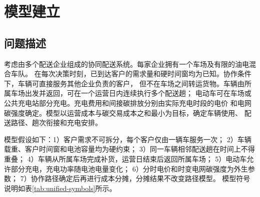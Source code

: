 \section{模型建立}

\subsection{问题描述}

考虑由多个配送企业组成的协同配送系统。每家企业拥有一个车场及有限的油电混合车队。
在每次决策时刻，已到达客户的需求量和硬时间窗均为已知。协作条件下，车辆可直接服务其他企业负责的客户，
但不在车场之间转运货物。车辆由所属车场出发并返回，可在一个运营日内连续执行多个配送趟；
电动车可在车场或公共充电站部分充电。充电费用和间接碳排放分别由实际充电时段的电价
和电网碳强度确定。模型以运营成本与碳交易成本之和最小为目标，确定车辆使用、
配送路径、趟次衔接和充电安排。

模型假设如下：1）客户需求不可拆分，每个客户仅由一辆车服务一次；
2）车辆载重、客户时间窗和电池容量均为硬约束；
3）同一车辆相邻配送趟在时间上不得重叠；
4）车辆从所属车场完成补货，运营日结束后返回所属车场；
5）电动车允许部分充电，充电功率随电池电量变化；
6）分时电价和时变电网碳强度为外生参数；
7）协作路径确定后再进行成本分摊，分摊结果不改变路径模型。
模型符号说明如表\ref{tab:unified-symbols}所示。

